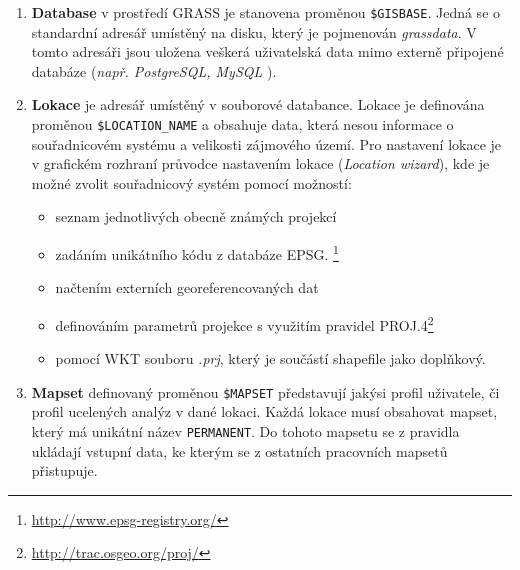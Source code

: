 \documentclass[a4paper,12pt,oneside]{report}
\begin{document}
\begin{enumerate}
\item \textbf{Database} v prostředí GRASS je stanovena proměnou
  \texttt{\$GISBASE}. Jedná se o standardní adresář umístěný na disku,
  který je pojmenován \textit{grassdata}. V tomto adresáři jsou
  uložena veškerá uživatelská data mimo externě připojené databáze
  (\textit{např. PostgreSQL, MySQL }).

\item \textbf{Lokace} je adresář umístěný v souborové
  databance. Lokace je definována proměnou \texttt{\$LOCATION\_NAME} a
  obsahuje data, která nesou informace o souřadnicovém systému a
  velikosti zájmového území. Pro nastavení lokace je v grafickém
  rozhraní průvodce nastavením lokace (\textit{Location wizard}), kde
  je možné zvolit souřadnicový systém pomocí možností:
\begin{itemize}
\item seznam jednotlivých obecně známých projekcí 
\item zadáním unikátního kódu z databáze    \acs{EPSG}. \footnote{\url{http://www.epsg-registry.org/}}
\item načtením externích georeferencovaných dat
\item definováním parametrů projekce s využitím pravidel PROJ.4\footnote{\url{http://trac.osgeo.org/proj/}}
\item pomocí \ac{WKT} souboru \emph{.prj}, který je součástí shapefile jako doplňkový.
\end{itemize}

\item \textbf{Mapset} definovaný proměnou \texttt{\$MAPSET}
  představují jakýsi profil uživatele, či profil ucelených analýz v
  dané lokaci. Každá lokace musí obsahovat mapset, který má unikátní
  název \texttt{PERMANENT}. Do tohoto mapsetu se z pravidla ukládají
  vstupní data, ke kterým se z ostatních pracovních mapsetů
  přistupuje.
\end{enumerate}
\end{document}
